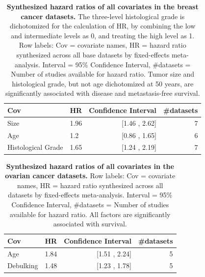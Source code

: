 \documentclass{article}
\begin{document}
  \begin{table}[H]
  \centering
    \begin{tabular}{llrr}
    \toprule
    Cov & HR & Confidence Interval & \#datasets\\
    \midrule
    Size  & 1.96  & [1.46 , 2.62] & 7 \\
    Age   & 1.2   & [0.86 , 1.65] & 6 \\
    Histological Grade & 1.65  & [1.24 , 2.19] & 7 \\
    \bottomrule
    \end{tabular}
    \caption{\textbf{Synthesized hazard ratios of all covariates in the breast cancer datasets.}
       The three-level histological grade is dichotomized for the calculation of HR, by combining the low and intermediate levels as 0, and treating the high level as 1. Row labels: Cov = covariate names, HR =
      hazard ratio synthesized across all base datasets by
      fixed-effects meta-analysis. Interval =
      95\% Confidence Interval, \#datasets = Number of studies available for
      hazard ratio. Tumor size and
      histological grade, but not age dichotomized at 50 years, are significantly associated with
      disease and metastasis-free survival. }
  \label{HR-table}
\end{table}

  \begin{table}[H]
  \centering
    \begin{tabular}{llrr}
    \toprule
    Cov & HR & Confidence Interval & \#datasets\\
    \midrule
    Age  &  1.84 & [1.51 , 2.24] & 5 \\
    Debulking  & 1.48   & [1.23 , 1.78] & 5 \\
    \bottomrule
    \end{tabular}
    \caption{\textbf{Synthesized hazard ratios of all covariates in the ovarian cancer datasets.}
      Row labels: Cov = covariate names, HR =
      hazard ratio synthesized across all datasets by
      fixed-effects meta-analysis. Interval =
      95\% Confidence Interval, \#datasets = Number of studies available for
      hazard ratio. All factors are significantly associated with
      survival. }
  \label{HR-table-ovarian}
\end{table}
\end{document}
